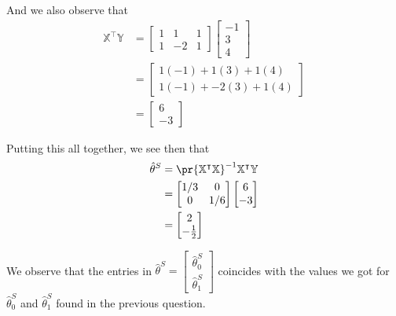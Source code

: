 \documentclass{article}
\begin{document}
\begin{solution}
	And we also observe that
	\begin{align*}
		\mathbb X^{\intercal} \mathbb Y &= \begin{bmatrix}
			1 & 1 & 1 \\ 1 & -2 & 1
		\end{bmatrix} \begin{bmatrix}
		-1 \\ 3 \\ 4
	\end{bmatrix} \\
	&= \begin{bmatrix}
		1(-1) + 1(3) + 1(4) \\ 1(-1) + -2(3) + 1(4)
	\end{bmatrix} \\
	&= \begin{bmatrix}
		6 \\ -3
	\end{bmatrix}
	\end{align*}

	Putting this all together, we see then that
	\begin{align*}
		\hat\theta^{S} &= \pr{\mathbb X^{\intercal} \mathbb X}^{-1} \mathbb X^{\intercal} \mathbb Y \\
		&= \begin{bmatrix}
			1/3 & 0 \\ 0 & 1/6
		\end{bmatrix} \begin{bmatrix}
		6 \\ -3
	\end{bmatrix} \\
	&= \begin{bmatrix}
		2 \\ -\frac{1}{2}
	\end{bmatrix}
	\end{align*}

	We observe that the entries in $\hat\theta^{S} = \begin{bmatrix}
		\hat\theta_{0}^{S} \\ \hat\theta_1^{S}
	\end{bmatrix}$ coincides with the values we got for $\hat\theta_0^{S}$ and $\hat\theta_1^{S}$ found in the previous question.
\end{solution}
\end{document}
